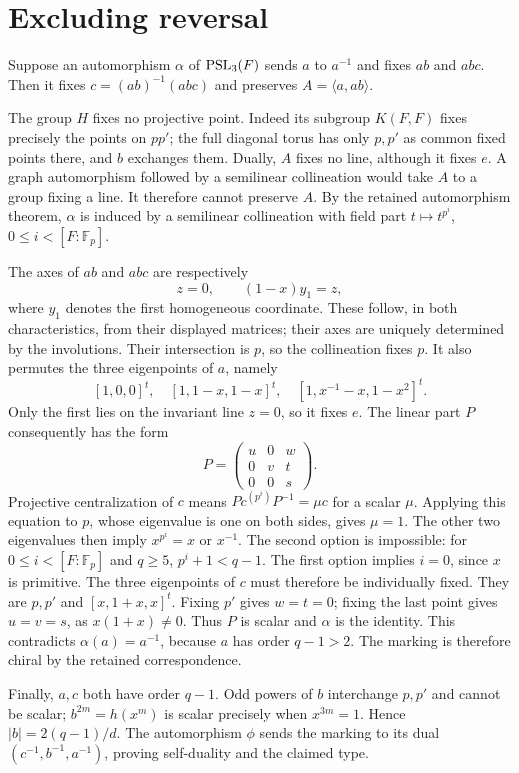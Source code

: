 \documentclass[11pt,a4paper]{article}
\begin{document}
\section{Excluding reversal}
Suppose an automorphism $\alpha$ of $\operatorname{PSL}_3(F)$ sends $a$ to $a^{-1}$
and fixes $ab$ and $abc$. Then it fixes $c=(ab)^{-1}(abc)$ and
preserves $A=\langle a,ab\rangle$.

The group $H$ fixes no projective point. Indeed its subgroup $K(F,F)$
fixes precisely the points on $pp'$; the full diagonal torus has only
$p,p'$ as common fixed points there, and $b$ exchanges them. Dually,
$A$ fixes no line, although it fixes $e$. A graph automorphism followed
by a semilinear collineation would take $A$ to a group fixing a line.
It therefore cannot preserve $A$. By the retained automorphism theorem,
$\alpha$ is induced by a semilinear collineation with field part
$t\mapsto t^{p^i}$, $0\leq i<[F:\mathbb F_p]$.

The axes of $ab$ and $abc$ are respectively
\[
                        z=0,\qquad (1-x)y_1=z,
\]
where $y_1$ denotes the first homogeneous coordinate.
These follow, in both characteristics, from their displayed matrices;
their axes are uniquely determined by the involutions. Their intersection
is $p$, so the collineation fixes $p$. It also permutes the three
eigenpoints of $a$, namely
\[
 [1,0,0]^t,\quad[1,1-x,1-x]^t,\quad
 [1,x^{-1}-x,1-x^2]^t.
\]
Only the first lies on the invariant line $z=0$, so it fixes $e$.
The linear part $P$ consequently has the form
\[
                     P=\begin{pmatrix}u&0&w\\0&v&t\\0&0&s\end{pmatrix}.
\]
Projective centralization of $c$ means
$Pc^{(p^i)}P^{-1}=\mu c$ for a scalar $\mu$.
Applying this equation to $p$, whose eigenvalue is one on both sides,
gives $\mu=1$. The other two eigenvalues then imply
$x^{p^i}=x$ or $x^{-1}$. The second option is impossible:
for $0\leq i<[F:\mathbb F_p]$ and $q\geq5$,
$p^i+1<q-1$. The first option implies $i=0$, since $x$ is primitive.
The three eigenpoints of $c$ must therefore be individually fixed.
They are $p,p'$ and $[x,1+x,x]^t$. Fixing $p'$ gives $w=t=0$;
fixing the last point gives $u=v=s$, as $x(1+x)\ne0$.
Thus $P$ is scalar and $\alpha$ is the identity. This contradicts
$\alpha(a)=a^{-1}$, because $a$ has order $q-1>2$.
The marking is therefore chiral by the retained correspondence.

Finally, $a,c$ both have order $q-1$. Odd powers of $b$ interchange
$p,p'$ and cannot be scalar; $b^{2m}=h(x^m)$ is scalar precisely
when $x^{3m}=1$. Hence $|b|=2(q-1)/d$. The automorphism $\phi$
sends the marking to its dual $(c^{-1},b^{-1},a^{-1})$, proving
self-duality and the claimed type.
\end{document}
